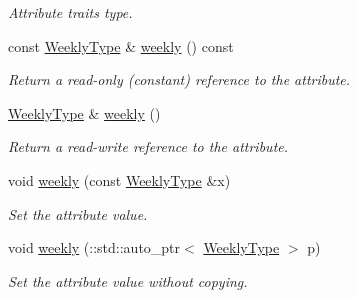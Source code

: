\begin{DoxyCompactItemize}
\begin{DoxyCompactList}\small\item\em Attribute traits type. \item\end{DoxyCompactList}\item 
const \hyperlink{classopenstack_1_1xml_1_1WeeklyBackup}{WeeklyType} \& \hyperlink{classopenstack_1_1xml_1_1BackupSchedule_a7d44d2e0a48a79ea99d91ea4e54d77f3}{weekly} () const 
\begin{DoxyCompactList}\small\item\em Return a read-\/only (constant) reference to the attribute. \item\end{DoxyCompactList}\item 
\hyperlink{classopenstack_1_1xml_1_1WeeklyBackup}{WeeklyType} \& \hyperlink{classopenstack_1_1xml_1_1BackupSchedule_a0e45cc102484439c764872e4abbe6926}{weekly} ()
\begin{DoxyCompactList}\small\item\em Return a read-\/write reference to the attribute. \item\end{DoxyCompactList}\item 
void \hyperlink{classopenstack_1_1xml_1_1BackupSchedule_acbd380828838098519bff5112808b2de}{weekly} (const \hyperlink{classopenstack_1_1xml_1_1WeeklyBackup}{WeeklyType} \&x)
\begin{DoxyCompactList}\small\item\em Set the attribute value. \item\end{DoxyCompactList}\item 
void \hyperlink{classopenstack_1_1xml_1_1BackupSchedule_a0c7ea43b44e2581539a542d27315775f}{weekly} (::std::auto\_\-ptr$<$ \hyperlink{classopenstack_1_1xml_1_1WeeklyBackup}{WeeklyType} $>$ p)
\begin{DoxyCompactList}\small\item\em Set the attribute value without copying. \item\end{DoxyCompactList}\end{DoxyCompactItemize}
